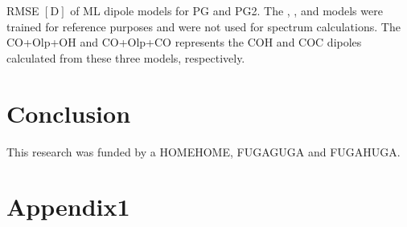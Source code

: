 \documentclass[luatex,twocolumn,showpacs,aps,prb,reprint,amsfonts,amsmath,amssymb,floatfix,groupedaddress, longbibliography]{revtex4-2}
\begin{document}

\begin{table}[tb] %
\centering
\caption{RMSE $[\mathrm{D}]$ of \ac{ML} dipole models for \ac{PG} and PG2. The , , and  models were trained for reference purposes and were not used for spectrum calculations. The CO+Olp+OH and CO+Olp+CO represents the COH and COC dipoles calculated from these three models, respectively.}
 
\label{table:rmse}
\end{table}



\section{Conclusion}\label{sec:conclusion}

\lipsum[2]




\begin{acknowledgments}
This research was funded by a HOMEHOME, FUGAGUGA and FUGAHUGA.
\end{acknowledgments}





\appendix

\section{Appendix1}\label{appendix:A}
\lipsum[1-2]






\end{document}
